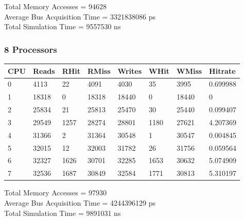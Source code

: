 \documentclass[]{article}
\begin{document}
Total Memory Accesses = 94628\\
Average Bus Acquisition Time = 3321838086 ps\\
Total Simulation Time = 9557530 ns\\

\subsubsection{8 Processors}

\begin{table}[H]
	\begin{tabular}{|l|l|l|l|l|l|l|l|}
		\hline
		\textbf{CPU} & \textbf{Reads} & \textbf{RHit} & \textbf{RMiss} & \textbf{Writes} & \textbf{WHit} & \textbf{WMiss} & \textbf{Hitrate} \\ \hline
		0            & 4113           & 22            & 4091           & 4030            & 35            & 3995           & 0.699988         \\ \hline
		1            & 18318          & 0             & 18318          & 18440           & 0             & 18440          & 0                \\ \hline
		2            & 25834          & 21            & 25813          & 25470           & 30            & 25440          & 0.099407         \\ \hline
		3            & 29549          & 1257          & 28274          & 28801           & 1180          & 27621          & 4.207369         \\ \hline
		4            & 31366          & 2             & 31364          & 30548           & 1             & 30547          & 0.004845         \\ \hline
		5            & 32015          & 12            & 32003          & 31782           & 26            & 31756          & 0.059564         \\ \hline
		6            & 32327          & 1626          & 30701          & 32285           & 1653          & 30632          & 5.074909         \\ \hline
		7            & 32536          & 1687          & 30849          & 32584           & 1771          & 30813          & 5.310197         \\ \hline
	\end{tabular}
\end{table}

Total Memory Accesses = 97930\\
Average Bus Acquisition Time = 4244396129 ps\\
Total Simulation Time = 9891031 ns\\
\end{document}

